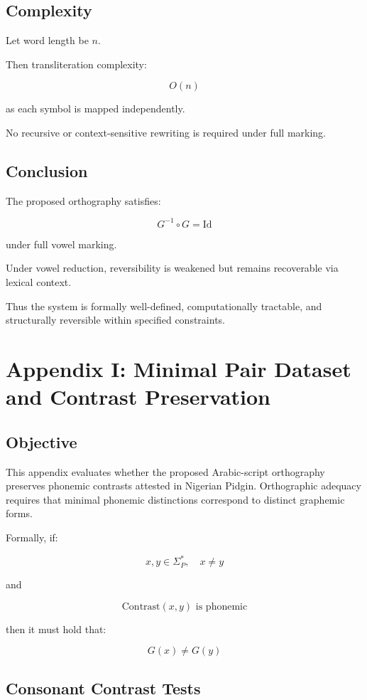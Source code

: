 \documentclass[12pt]{article}
\begin{document}
\subsection{Complexity}

Let word length be \( n \).

Then transliteration complexity:

\[
O(n)
\]

as each symbol is mapped independently.

No recursive or context-sensitive rewriting is required under full marking.

\subsection{Conclusion}

The proposed orthography satisfies:

\[
G^{-1} \circ G = \mathrm{Id}
\]

under full vowel marking.

Under vowel reduction, reversibility is weakened but remains recoverable via lexical context.

Thus the system is formally well-defined, computationally tractable, and structurally reversible within specified constraints.

\section{Appendix I: Minimal Pair Dataset and Contrast Preservation}

\subsection{Objective}

This appendix evaluates whether the proposed Arabic-script orthography preserves phonemic contrasts attested in Nigerian Pidgin. Orthographic adequacy requires that minimal phonemic distinctions correspond to distinct graphemic forms.

Formally, if:

\[
x, y \in \Sigma_P^*, \quad x \neq y
\]

and

\[
\text{Contrast}(x,y) \text{ is phonemic}
\]

then it must hold that:

\[
G(x) \neq G(y)
\]

\subsection{Consonant Contrast Tests}
\end{document}

